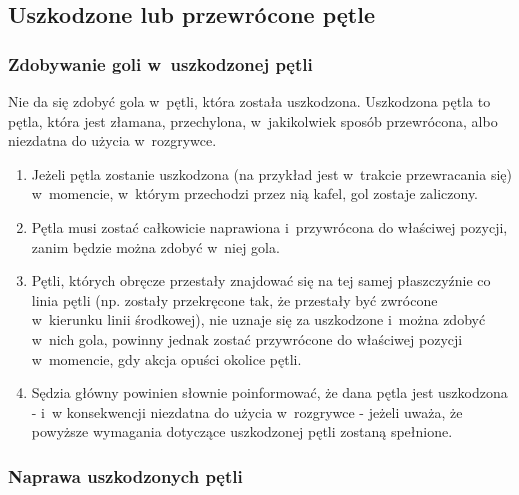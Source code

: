 \documentclass[12pt]{article}
\begin{document}
\subsection{Uszkodzone lub przewrócone pętle}

\subsubsection{Zdobywanie goli w~uszkodzonej pętli}
Nie da się zdobyć
gola w~pętli, która została uszkodzona. Uszkodzona pętla to pętla, która
jest złamana, przechylona, w~jakikolwiek sposób przewrócona, albo
niezdatna do użycia w~rozgrywce.

\begin{enumerate}
	\item
	      Jeżeli pętla zostanie uszkodzona (na przykład jest w~trakcie
	      przewracania się) w~momencie, w~którym przechodzi przez nią kafel, gol
	      zostaje zaliczony.
	\item
	      Pętla musi zostać całkowicie naprawiona i~przywrócona do właściwej
	      pozycji, zanim będzie można zdobyć w~niej gola.
	\item
	      Pętli, których obręcze przestały znajdować się na tej samej
	      płaszczyźnie co linia pętli (np. zostały przekręcone tak, że przestały
	      być zwrócone w~kierunku linii środkowej), nie uznaje się za uszkodzone
	      i~można zdobyć w~nich gola, powinny jednak zostać przywrócone do
	      właściwej pozycji w~momencie, gdy akcja opuści okolice pętli.
	\item
	      Sędzia główny powinien słownie poinformować, że dana pętla jest
	      uszkodzona - i~w konsekwencji niezdatna do użycia w~rozgrywce - jeżeli
	      uważa, że powyższe wymagania dotyczące uszkodzonej pętli zostaną
	      spełnione.
\end{enumerate}

\subsubsection{Naprawa uszkodzonych pętli}
\end{document}
